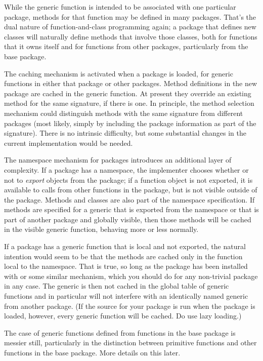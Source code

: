 \documentclass[11pt]{article}
\begin{document}
While the generic function is intended to be associated with one particular package, methods for that function may be defined in many packages.
That's the dual nature of function-and-class programming again; a package that defines new classes will naturally define methods that involve those classes, both for functions that it owns itself and for functions from other packages, particularly from the base package.

The caching mechanism is activated when a package is loaded, for generic functions in either that package or other packages.
Method definitions in the new package are cached in the generic function.
At present they override an existing method for the same signature, if there is one.
In principle, the method selection mechanism could distinguish methods with the same signature from different packages (most likely, simply by including the package information as part of the signature).
There is no intrinsic difficulty, but some substantial changes in the current implementation would be needed.

The namespace mechanism for packages introduces an additional layer of complexity.
If a package has a namespace, the implementer chooses whether or not to \emph{export} objects from the package; if a function object is not exported, it is available to calls from other functions in the package, but is not visible outside of the package.
Methods and classes are also part of the namespace specification.
If methods are specified for a generic that is exported from the namespace or that is part of another package and globally visible, then those methods will be cached in the visible generic function, behaving more or less normally.

If a package has a generic function that is local and not exported, the natural intention would seem to be that the methods are cached only in the function local to the namespace.
That is true, so long as the package has been installed with  or some similar mechanism, which you should do for any non-trivial package in any case.
The generic is then not cached in the global table of generic functions and in particular will not interfere with an identically named generic from another package.
(If the source for  your package is run when the package is loaded, however, every generic function will be cached.  Do use lazy loading.)

The case of generic functions defined from functions in the base package is messier still, particularly in the distinction between primitive functions and other functions in the base package.
More details on this later.
\end{document}
